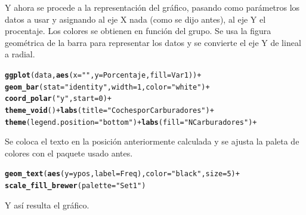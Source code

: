 \documentclass{article}\usepackage[]{graphicx}\usepackage[]{color}
\makeatletter
\newcommand{\hlnum}[1]{\textcolor[rgb]{0.686,0.059,0.569}{#1}}%
\newcommand{\hlstr}[1]{\textcolor[rgb]{0.192,0.494,0.8}{#1}}%
\newcommand{\hlopt}[1]{\textcolor[rgb]{0,0,0}{#1}}%
\newcommand{\hlstd}[1]{\textcolor[rgb]{0.345,0.345,0.345}{#1}}%
\newcommand{\hlkwc}[1]{\textcolor[rgb]{0.333,0.667,0.333}{#1}}%
\newcommand{\hlkwd}[1]{\textcolor[rgb]{0.737,0.353,0.396}{\textbf{#1}}}%
\newenvironment{kframe}{%
 \def\at@end@of@kframe{}%
 \ifinner\ifhmode%
  \def\at@end@of@kframe{\end{minipage}}%
  \begin{minipage}{\columnwidth}%
 \fi\fi%
 \def\FrameCommand##1{\hskip\@totalleftmargin \hskip-\fboxsep
 \colorbox{shadecolor}{##1}\hskip-\fboxsep
     \hskip-\linewidth \hskip-\@totalleftmargin \hskip\columnwidth}%
 \MakeFramed {\advance\hsize-\width
   \@totalleftmargin\z@ \linewidth\hsize
   \@setminipage}}%
 {\par\unskip\endMakeFramed%
 \at@end@of@kframe}
\newenvironment{knitrout}{}{} %
\makeatother
\begin{document}
Y ahora se procede a la representaci\'on del gr\'afico, pasando como par\'ametros los datos a usar y asignando al eje X nada (como se dijo antes), al eje Y el procentaje. Los colores se obtienen en funci\'on del grupo. Se usa la figura geom\'etrica de la barra para representar los datos y se convierte el eje Y de lineal a radial.
\begin{knitrout}
\color{fgcolor}\begin{kframe}
\begin{alltt}
\hlkwd{ggplot}(data, \hlkwd{aes}(x=\hlstr{""}, y=Porcentaje, fill=Var1)) +
  \hlkwd{geom_bar}(stat=\hlstr{"identity"}, width=1, color=\hlstr{"white"}) +
  \hlkwd{coord_polar}(\hlstr{"y"}, start=0) +
  \hlkwd{theme_void}() + \hlkwd{labs}(title=\hlstr{"Coches por Carburadores"}) +
  \hlkwd{theme}(legend.position=\hlstr{"bottom"}) + \hlkwd{labs}(fill = \hlstr{"N Carburadores"}) +
\end{alltt}
\end{kframe}
\end{knitrout}
Se coloca el texto en la posici\'on anteriormente calculada y se ajusta la paleta de colores con el paquete usado antes.
\begin{knitrout}
\color{fgcolor}\begin{kframe}
\begin{alltt}
  \hlkwd{geom_text}\hlstd{(}\hlkwd{aes}\hlstd{(}\hlkwc{y} \hlstd{= ypos,} \hlkwc{label} \hlstd{= Freq),} \hlkwc{color} \hlstd{=} \hlstr{"black"}\hlstd{,} \hlkwc{size}\hlstd{=}\hlnum{5}\hlstd{)} \hlopt{+}
  \hlkwd{scale_fill_brewer}\hlstd{(}\hlkwc{palette}\hlstd{=}\hlstr{"Set1"}\hlstd{)}
\end{alltt}
\end{kframe}
\end{knitrout}
\clearpage
Y as\'i resulta el gr\'afico.
\end{document}
